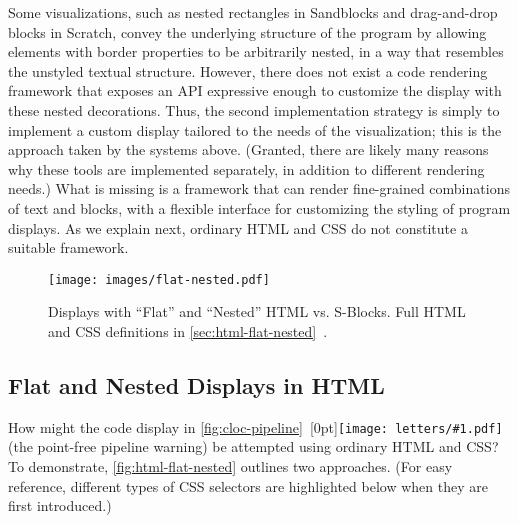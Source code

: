 \documentclass[acmsmall, screen]{acmart}
\newcommand{\refAppendixHtmlFlatNested}
  {\autoref{sec:html-flat-nested}~\cite{Hass}}
\newcommand{\figBubble}[1]{\raisebox{-0.03in}[0pt]{\texttt{[image: letters/\#1.pdf]}}}
\newcommand{\refBubble}[1]
  {~\figBubble{#1}}
\begin{document}
Some visualizations, such as nested rectangles in Sandblocks and drag-and-drop blocks in Scratch, convey the underlying structure of the program by allowing elements with border properties to be arbitrarily nested, in a way that resembles the unstyled textual structure.
However, there does not exist a code rendering framework that exposes an API expressive enough to customize the display with these nested decorations.
Thus, the second implementation strategy is simply to implement a custom display tailored to the needs of the visualization; this is the approach taken by the systems above. (Granted, there are likely many reasons why these tools are implemented separately, in addition to different rendering needs.)
What is missing is a framework that can render fine-grained combinations of text and blocks, with a flexible interface for customizing the styling of program displays.
As we explain next, ordinary HTML and CSS do not constitute a suitable framework.

\begin{figure}[b]

\texttt{[image: images/flat-nested.pdf]}

\caption{
Displays with ``Flat'' and ``Nested'' HTML vs. S-Blocks.
Full HTML and CSS definitions in \refAppendixHtmlFlatNested{}.
}
\label{fig:html-flat-nested}
\end{figure}
 








\subsection{Flat and Nested Displays in HTML}
\label{sec:overview-layout}

\setlength\fboxsep{0pt}

\newcommand{\highlightCssTerm}[1]
{\colorbox{orange!20}{#1}}

How might the code display in \autoref{fig:cloc-pipeline}\refBubble{f} (the point-free pipeline warning) be attempted using ordinary HTML and CSS?
To demonstrate, \autoref{fig:html-flat-nested} outlines two approaches.
(For easy reference, different types of \highlightCssTerm{CSS selectors} are highlighted below when they are first introduced.)
\end{document}
